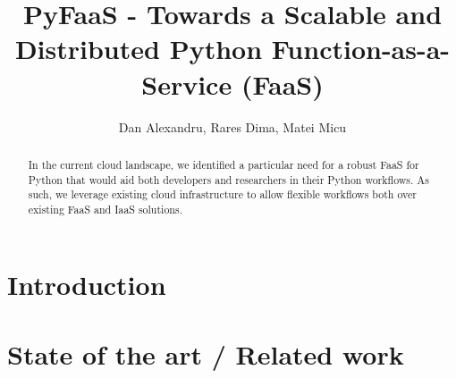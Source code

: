 \documentclass[runningheads]{llncs}
\begin{document}
%
\title{PyFaaS - Towards a Scalable and Distributed Python Function-as-a-Service (FaaS)}
%
%
\author{Dan Alexandru, Rares Dima, Matei Micu}
%
%
%
\maketitle              %
%
\begin{abstract}
In the current cloud landscape, we identified a particular need for a robust FaaS for Python that would aid both developers and researchers in their Python workflows. As such, we leverage existing cloud infrastructure to allow flexible workflows both over existing FaaS and IaaS solutions.

\end{abstract}
%
%

\section{Introduction}





\FloatBarrier
\section{State of the art / Related work}

\end{document}
